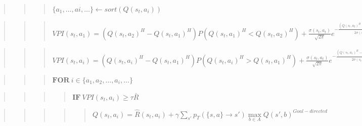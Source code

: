 \documentclass[10pt,a4paper,onecolumn]{article}
\begin{document}
\begin{quote}
\begin{quote}
\begin{quote}
\(\{a_1,\ldots,ai,\ldots\} \leftarrow sort(Q(s_t,a_i))\)
\end{quote}
\end{quote}
\end{quote}

\begin{quote}
\begin{quote}
\begin{quote}
\(VPI(s_t, a_1) = (Q(s_t,a_2)^{H}-Q(s_t,a_1)^{H})P(Q(s_t,a_1)^{H}<Q(s_t,a_2)^{H}) + \frac{\sigma(s_t,a_t)}{\sqrt{2\pi}} e^{-\frac{(Q(s_t,a_2)^H - Q(s_t,a_1)^H)^2}{2\sigma(s_t,a_t)^2}}\)
\end{quote}
\end{quote}
\end{quote}

\begin{quote}
\begin{quote}
\begin{quote}
\(VPI(s_t, a_i) = (Q(s_t,a_i)^{H}-Q(s_t,a_1)^{H})P(Q(s_t,a_i)^{H}>Q(s_t,a_1)^{H}) + \frac{\sigma(s_t,a_t)}{\sqrt{2\pi}} e^{-\frac{(Q(s_t,a_1)^H - Q(s_t,a_i)^H)^2}{2\sigma(s_t,a_t)^2}}\)
\end{quote}
\end{quote}
\end{quote}

\begin{quote}
\begin{quote}
\begin{quote}
\(\textbf{FOR}\ i \in \{a_1, a_2,\ldots, a_i, \ldots\}\)
\end{quote}
\end{quote}
\end{quote}

\begin{quote}
\begin{quote}
\begin{quote}
\begin{quote}
\(\textbf{IF}\ VPI(s_t, a_i) \geq \tau \bar{R}\)
\end{quote}
\end{quote}
\end{quote}
\end{quote}

\begin{quote}
\begin{quote}
\begin{quote}
\begin{quote}
\begin{quote}
\(Q(s_t,a_i) = \hat{R}(s_t,a_i) + \gamma \sum\limits_{s'}p_{T}(\{s,a\}\rightarrow s') \max\limits_{b \in A} Q(s',b)^{Goal-directed}\)
\end{quote}
\end{quote}
\end{quote}
\end{quote}
\end{quote}
\end{document}
